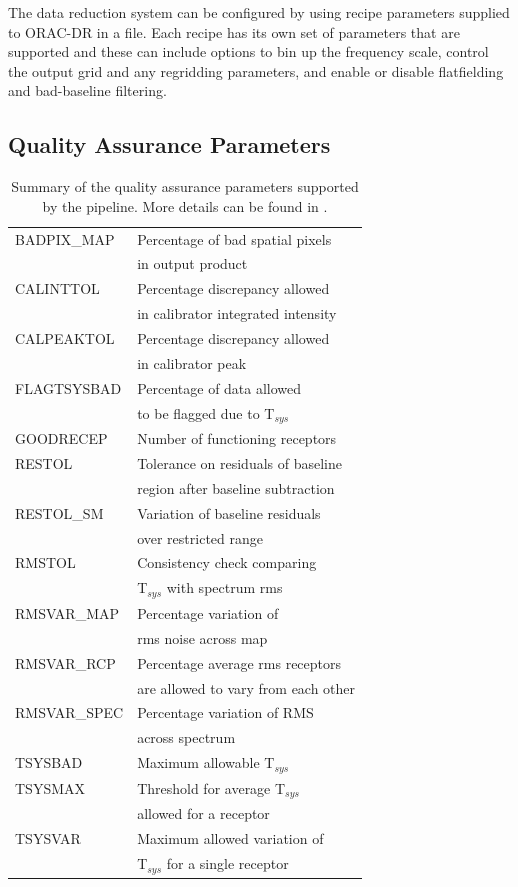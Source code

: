 \documentclass[final,authoryear,5p,times,twocolumn]{elsarticle}
\begin{document}
The data reduction system can be configured by using recipe parameters
supplied to ORAC-DR in a file. Each recipe has its own set of
parameters that are supported and these can include options to bin up
the frequency scale, control the output grid and any regridding
parameters, and enable or disable flatfielding and bad-baseline filtering.

\subsection{Quality Assurance Parameters \label{sec:qa}}

\begin{table}
  \caption{Summary of the quality assurance parameters supported by
    the pipeline. More details can be found in \citep{2008JCMTLSQA}.}
\label{tab:qa:params}
\begin{tabular}{ll}
BADPIX\_MAP  & Percentage of bad spatial pixels\\
   & in output product\\
CALINTTOL & Percentage discrepancy allowed\\
    &  in calibrator integrated intensity \\
CALPEAKTOL & Percentage discrepancy allowed\\
    & in calibrator peak\\
FLAGTSYSBAD & Percentage of data allowed \\
   & to be flagged due to T$_{sys}$\\
GOODRECEP & Number of functioning receptors\\
RESTOL & Tolerance on residuals of baseline \\
   & region after baseline subtraction\\
RESTOL\_SM & Variation of baseline residuals \\
  & over restricted range\\
RMSTOL & Consistency check comparing\\
  & T$_{sys}$ with spectrum rms\\
RMSVAR\_MAP & Percentage variation of\\
  & rms noise across map \\
RMSVAR\_RCP &  Percentage average rms receptors\\
  & are allowed to vary from each other\\
RMSVAR\_SPEC & Percentage variation of RMS\\
  & across spectrum \\
TSYSBAD &  Maximum allowable T$_{sys}$\\
TSYSMAX & Threshold for  average T$_{sys}$ \\
  & allowed for a receptor\\
TSYSVAR &  Maximum allowed variation of\\
  & T$_{sys}$ for a single receptor\\
\end{tabular}
\end{table}
\end{document}
